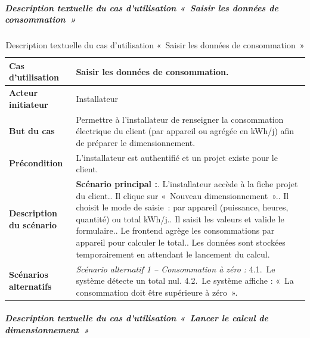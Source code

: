 \subparagraph{Description textuelle du cas d'utilisation «~Saisir les données de consommation~»}

\begin{table}[H]
  \caption{Description textuelle du cas d'utilisation «~Saisir les données de consommation~»}
  \label{tab:cu-saisir-conso}
  \centering
  \begin{tabularx}{\textwidth}{|L{3.8cm}|X|}
    \hline
    \textbf{Cas d'utilisation} & Saisir les données de consommation. \\
    \hline
    \textbf{Acteur initiateur} & Installateur \\
    \hline
    \textbf{But du cas} & Permettre à l'installateur de renseigner la consommation électrique du client (par appareil ou agrégée en kWh/j) afin de préparer le dimensionnement. \\
    \hline
    \textbf{Précondition} & L'installateur est authentifié et un projet existe pour le client. \\
    \hline
    \textbf{Description du scénario} &
    \textbf{Scénario principal :}. L'installateur accède à la fiche projet du client.. Il clique sur «~Nouveau dimensionnement~».. Il choisit le mode de saisie~: par appareil (puissance, heures, quantité) ou total kWh/j.. Il saisit les valeurs et valide le formulaire.. Le frontend agrège les consommations par appareil pour calculer le total.. Les données sont stockées temporairement en attendant le lancement du calcul.\\
    \hline
    \textbf{Scénarios alternatifs} &
    \textit{Scénario alternatif 1 -- Consommation à zéro :}\newline
    \hspace*{6pt}4.1.~Le système détecte un total nul.\newline
    \hspace*{6pt}4.2.~Le système affiche : «~La consommation doit être supérieure à zéro~».\\
    \hline
  \end{tabularx}
\end{table}

\subparagraph{Description textuelle du cas d'utilisation «~Lancer le calcul de dimensionnement~»}

